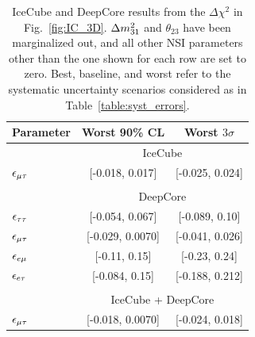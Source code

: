 {{\begin{table}
\begin{center}
      \begin{tabular}{lcc}
         \hline
         Parameter & Worst 90\% CL & Worst $3\sigma$\\
         \hline & \multicolumn{2}{c}{IceCube}  \\
         $\epsilon_{\mu\tau}$ &  [-0.018, 0.017] &  [-0.025, 0.024] \\\\
         & \multicolumn{2}{c}{DeepCore}\\ [0.3em]
         $\epsilon_{\tau\tau}$ &  [-0.054, 0.067] &  [-0.089, 0.10] \\
         $\epsilon_{\mu\tau}$ &  [-0.029, 0.0070] &  [-0.041, 0.026] \\
         $\epsilon_{e\mu}$ &  [-0.11, 0.15] &  [-0.23, 0.24] \\
         $\epsilon_{e\tau}$ &   [-0.084, 0.15] &  [-0.188, 0.212] \\\\
         &\multicolumn{2}{c}{IceCube + DeepCore}\\
         $\epsilon_{\mu\tau}$ &  [-0.018, 0.0070] &  [-0.024, 0.018] \\
         \hline
      \end{tabular}
      \caption{IceCube and DeepCore results from the $\Delta \chi^2$ in Fig.~\ref{fig:IC_3D}. $\dm[31]$ and $\theta_{23}$ have been marginalized out, and all other NSI parameters other than the one shown for each row are set to zero. Best, baseline, and worst refer to 
      the systematic uncertainty scenarios considered as in Table~\ref{table:syst_errors}.}\label{table:IC_DC_results}
   \end{center}
\end{table}

}}
